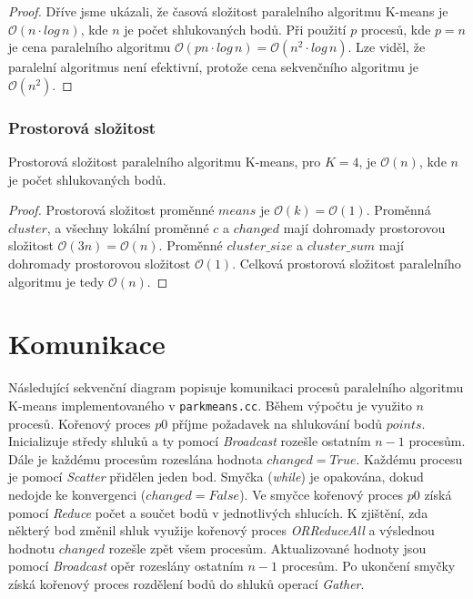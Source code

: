 \documentclass[a4paper, 11pt, fleqn]{scrartcl}
\begin{document}
        \begin{proof}
          Dříve jsme ukázali, že časová složitost paralelního algoritmu K-means je $\mathcal{O}(n\cdot log\, n)$, kde $n$ je počet shlukovaných bodů. Při použití $p$ procesů, kde $p = n$ je cena paralelního algoritmu $\mathcal{O}(pn\cdot log\, n) = \mathcal{O}(n^2\cdot log\, n)$. Lze viděl, že paralelní algoritmus není efektivní, protože cena sekvenčního algoritmu je $\mathcal{O}(n^2)$.
        \end{proof}

      \subsubsection{Prostorová složitost}
        Prostorová složitost paralelního algoritmu K-means, pro $K = 4$, je $\mathcal{O}(n)$, kde $n$ je počet shlukovaných bodů.

        \begin{proof}
          Prostorová složitost proměnné $means$ je $\mathcal{O}(k) = \mathcal{O}(1)$. Proměnná $cluster$, a všechny lokální proměnné $c$ a $changed$ mají dohromady prostorovou složitost $\mathcal{O}(3n) = \mathcal{O}(n)$. Proměnné $cluster\_size$ a $cluster\_sum$ mají dohromady prostorovou složitost $\mathcal{O}(1)$. Celková prostorová složitost paralelního algoritmu je tedy $\mathcal{O}(n)$.
        \end{proof}

  \section{Komunikace}

    Následující sekvenční diagram popisuje komunikaci procesů paralelního algoritmu K-means implementovaného v \texttt{parkmeans.cc}. Během výpočtu je využito $n$ procesů. Kořenový proces $p0$ příjme požadavek na shlukování bodů $points$. Inicializuje středy shluků a ty pomocí \textit{Broadcast} rozešle ostatním $n-1$ procesům.  Dále je každému procesům rozeslána hodnota $changed=True$. Každému procesu je pomocí \textit{Scatter} přidělen jeden bod. Smyčka (\textit{while}) je opakována, dokud nedojde ke konvergenci ($changed=False$). Ve smyčce kořenový proces $p0$ získá pomocí \textit{Reduce} počet a součet bodů v jednotlivých shlucích. K zjištění, zda některý bod změnil shluk využije kořenový proces \textit{ORReduceAll} a výslednou hodnotu $changed$ rozešle zpět všem procesům. Aktualizované hodnoty jsou pomocí \textit{Broadcast} opěr rozeslány ostatním $n-1$ procesům. Po ukončení smyčky získá kořenový proces rozdělení bodů do shluků operací \textit{Gather}.
\end{document}
